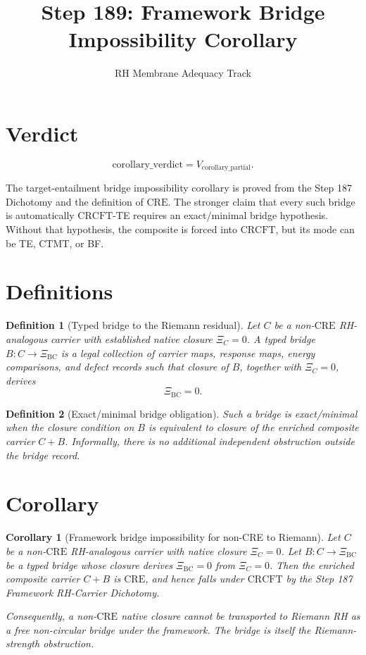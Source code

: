 \documentclass[11pt]{article}
\title{Step 189: Framework Bridge Impossibility Corollary}
\author{RH Membrane Adequacy Track}
\date{}
\newtheorem{definition}{Definition}
\newtheorem{corollary}{Corollary}
\newcommand{\XiBC}{\Xi_{\mathrm{BC}}}
\newcommand{\XiC}{\Xi_C}
\newcommand{\CRE}{\mathrm{CRE}}
\newcommand{\CRCFT}{\mathrm{CRCFT}}
\newcommand{\CTMT}{\mathrm{CTMT}}
\begin{document}
\maketitle

\section*{Verdict}

\[
\boxed{\mathrm{corollary\_verdict}=V_{\mathrm{corollary\_partial}}.}
\]

The target-entailment bridge impossibility corollary is proved from the Step
187 Dichotomy and the definition of \(\CRE\).  The stronger claim that every
such bridge is automatically \(\CRCFT\)-TE requires an exact/minimal bridge
hypothesis.  Without that hypothesis, the composite is forced into \(\CRCFT\),
but its mode can be TE, \(\CTMT\), or BF.

\section*{Definitions}

\begin{definition}[Typed bridge to the Riemann residual]
Let \(C\) be a non-\(\CRE\) RH-analogous carrier with established native
closure \(\XiC=0\).  A typed bridge \(B:C\to\XiBC\) is a legal collection of
carrier maps, response maps, energy comparisons, and defect records such that
closure of \(B\), together with \(\XiC=0\), derives
\[
\XiBC=0.
\]
\end{definition}

\begin{definition}[Exact/minimal bridge obligation]
Such a bridge is exact/minimal when the closure condition on \(B\) is
equivalent to closure of the enriched composite carrier \(C+B\).  Informally,
there is no additional independent obstruction outside the bridge record.
\end{definition}

\section*{Corollary}

\begin{corollary}[Framework bridge impossibility for non-CRE to Riemann]
Let \(C\) be a non-\(\CRE\) RH-analogous carrier with native closure
\(\XiC=0\).  Let \(B:C\to\XiBC\) be a typed bridge whose closure derives
\(\XiBC=0\) from \(\XiC=0\).  Then the enriched composite carrier \(C+B\) is
\(\CRE\), and hence falls under \(\CRCFT\) by the Step 187 Framework
RH-Carrier Dichotomy.

Consequently, a non-\(\CRE\) native closure cannot be transported to Riemann
RH as a free non-circular bridge under the framework.  The bridge is itself
the Riemann-strength obstruction.
\end{corollary}
\end{document}

